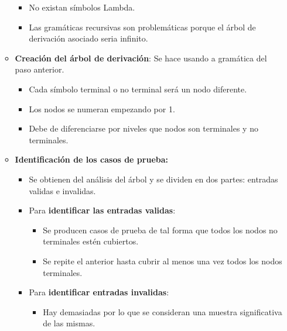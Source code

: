 \documentclass[12pt, twoside, openright]{report} %
\begin{document}
\begin{itemize}
\begin{itemize}
\begin{itemize}
    \item No existan símbolos Lambda.
      
    \item Las gramáticas recursivas son problemáticas porque el árbol de
      derivación asociado seria infinito.
      
    \end{itemize}
  \item \textbf{Creación del árbol de derivación}: Se hace usando a
    gramática del paso anterior.
    

    \begin{itemize}
    \item Cada símbolo terminal o no terminal será un nodo diferente.
      
    \item Los nodos se numeran empezando por 1.
      
    \item Debe de diferenciarse por niveles que nodos son terminales y no
      terminales.
      
    \end{itemize}
  \item \textbf{Identificación de los casos de prueba:}
    

    \begin{itemize}
    \item Se obtienen del análisis del árbol y se dividen en dos partes:
      entradas validas e invalidas.
      
    \item Para \textbf{identificar las entradas validas}:
      

      \begin{itemize}
      \item Se producen casos de prueba de tal forma que todos los nodos no
        terminales estén cubiertos.
        
      \item Se repite el anterior hasta cubrir al menos una vez todos los
        nodos terminales.
        
      \end{itemize}
    \item Para \textbf{identificar entradas invalidas}:
      

      \begin{itemize}
      \item Hay demasiadas por lo que se consideran una muestra
        significativa de las mismas.
        

\end{itemize}
\end{itemize}
\end{itemize}
\end{itemize}
\end{document}
